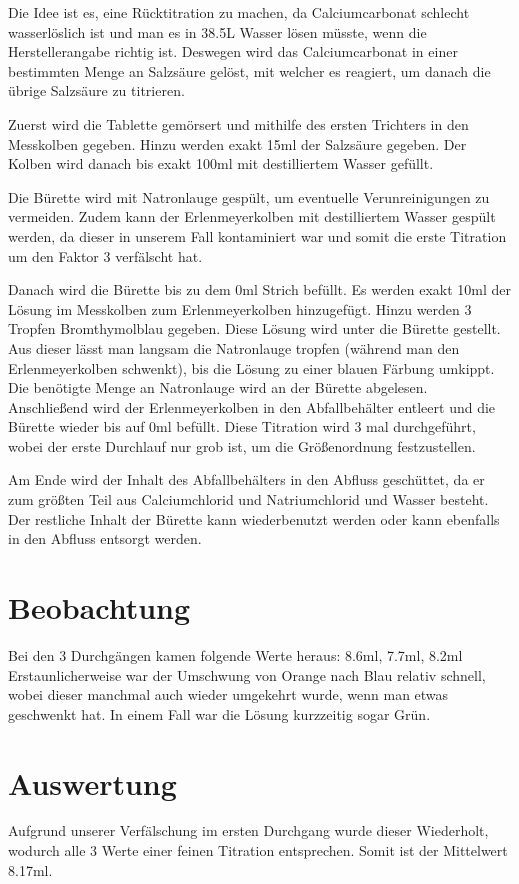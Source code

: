 \documentclass[8pt, letterpaper]{article}
\begin{document}
Die Idee ist es, eine Rücktitration zu machen, da Calciumcarbonat schlecht wasserlöslich ist und man es in 38.5L Wasser lösen müsste, wenn die Herstellerangabe richtig ist.
Deswegen wird das Calciumcarbonat in einer bestimmten Menge an Salzsäure gelöst, mit welcher es reagiert, um danach die übrige Salzsäure zu titrieren.

Zuerst wird die Tablette gemörsert und mithilfe des ersten Trichters in den Messkolben gegeben. Hinzu werden exakt 15ml der Salzsäure gegeben. Der Kolben wird danach bis exakt 100ml mit destilliertem Wasser gefüllt.

Die Bürette wird mit Natronlauge gespült, um eventuelle Verunreinigungen zu vermeiden. Zudem kann der Erlenmeyerkolben mit destilliertem Wasser gespült werden, da dieser in unserem Fall kontaminiert war und somit die erste Titration um den Faktor 3 verfälscht hat.

Danach wird die Bürette bis zu dem 0ml Strich befüllt. Es werden exakt 10ml der Lösung im Messkolben zum Erlenmeyerkolben hinzugefügt. Hinzu werden 3 Tropfen Bromthymolblau gegeben.
Diese Lösung wird unter die Bürette gestellt. Aus dieser lässt man langsam die Natronlauge tropfen (während man den Erlenmeyerkolben schwenkt), bis die Lösung zu einer blauen Färbung umkippt.
Die benötigte Menge an Natronlauge wird an der Bürette abgelesen. Anschließend wird der Erlenmeyerkolben in den Abfallbehälter entleert und die Bürette wieder bis auf 0ml befüllt.
Diese Titration wird 3 mal durchgeführt, wobei der erste Durchlauf nur grob ist, um die Größenordnung festzustellen.

Am Ende wird der Inhalt des Abfallbehälters in den Abfluss geschüttet, da er zum größten Teil aus Calciumchlorid und Natriumchlorid und Wasser besteht.
Der restliche Inhalt der Bürette kann wiederbenutzt werden oder kann ebenfalls in den Abfluss entsorgt werden.

\section{Beobachtung}
Bei den 3 Durchgängen kamen folgende Werte heraus: 8.6ml, 7.7ml, 8.2ml
Erstaunlicherweise war der Umschwung von Orange nach Blau relativ schnell, wobei dieser manchmal auch wieder umgekehrt wurde, wenn man etwas geschwenkt hat. In einem Fall war die Lösung kurzzeitig sogar Grün.

\section{Auswertung}
Aufgrund unserer Verfälschung im ersten Durchgang wurde dieser Wiederholt, wodurch alle 3 Werte einer feinen Titration entsprechen.
Somit ist der Mittelwert 8.17ml.
\end{document}
